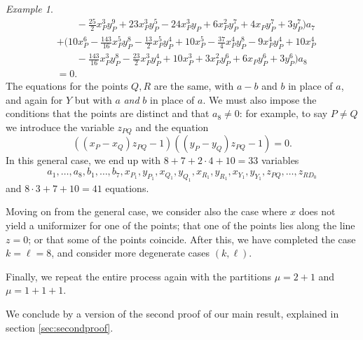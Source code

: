 \documentclass{amsproc}
\numberwithin{equation}{section}
\numberwithin{figure}{section}
\theoremstyle{definition}
\theoremstyle{remark}
\newtheorem{example}[equation]{Example}
\newcommand{\Q}{\QQ}
\newcommand{\scrL}{\mathscr{L}}
\newcommand\QQ{\mathbb{Q}}
\newcommand\scrO{\mathscr{O}}
\newcommand{\jv}[1]{{\color{red} \textsf{[[#1]]}}}
\begin{document}
\begin{example}
\begin{equation}
\begin{aligned}
    &\qquad - \tfrac{25}{2}x_{P}^3y_{P}^9 + 
    23x_{P}^3y_{P}^5 - 24x_{P}^3y_{P} + 6x_{P}^2y_{P}^7 + 4x_{P}y_{P}^7 + 3y_{P}^7)a_7 \\
    &+ 
    (10x_{P}^6 - \tfrac{143}{16}x_{P}^5y_{P}^8 - \tfrac{13}{2}x_{P}^5y_{P}^4 + 10x_{P}^5 - 
    \tfrac{37}{4}x_{P}^4y_{P}^8 - 9x_{P}^4y_{P}^4 + 10x_{P}^4 \\
    &\qquad - \tfrac{143}{16}x_{P}^3y_{P}^8 - 
    \tfrac{23}{2}x_{P}^3y_{P}^4 + 10x_{P}^3 + 3x_{P}^2y_{P}^6 + 6x_{P}y_{P}^6 + 3y_{P}^6)a_8 \\
    &=0.
\end{aligned}
\end{equation}
The equations for the points $Q,R$ are the same, with $a-b$ and $b$ in place of $a$, and again for $Y$ but with $a$ \emph{and} $b$ in place of $a$.  We must also impose the conditions that the points are distinct and that $a_8 \neq 0$: for example, to say $P \neq Q$ we introduce the variable $z_{PQ}$ and the equation 
\begin{equation} 
((x_P-x_Q)z_{PQ}-1)((y_P-y_Q)z_{PQ}-1) = 0.
\end{equation}
In this general case, we end up with $8+7+2\cdot 4 + 10 = 33$ variables 
\begin{equation} 
a_1,\dots,a_8,b_1,\dots,b_7,x_{P_1},y_{P_1},x_{Q_1},y_{Q_1},x_{R_1},y_{R_1},x_{Y_1},y_{Y_1},z_{PQ},\dots,z_{RD_0} 
\end{equation}
and $8\cdot 3 + 7 + 10 = 41$ equations.  

Moving on from the general case, we consider also the case where $x$ does not yield a uniformizer for one of the points; that one of the points lies along the line $z=0$; or that some of the points coincide.  After this, we have completed the case $k=\ell=8$, and consider more degenerate cases $(k,\ell)$.  

Finally, we repeat the entire process again with the partitions $\mu=2+1$ and $\mu=1+1+1$.
\end{example}


We conclude by a version of the second proof of our main result, explained in section \ref{sec:secondproof}.
\end{document}
